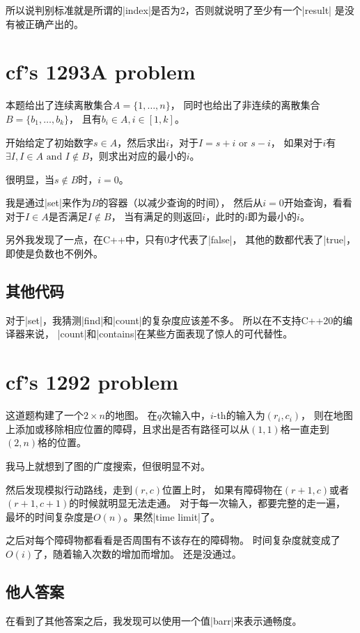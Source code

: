所以说判别标准就是所谓的\vb|index|是否为2，否则就说明了至少有一个\vb|result|
是没有被正确产出的。


\section{cf's 1293A problem}

本题给出了连续离散集合$A=\{1, \ldots, n\}$，
同时也给出了非连续的离散集合$B=\{b_1, \ldots, b_k\}$，
且有$b_i\in A, i\in [1, k]$。

开始给定了初始数字$s\in A$，然后求出$i$，对于$I=s+i\text{ or }s-i$，
如果对于$i$有$\exists I, I\in A\text{ and } I\notin B$，则求出对应的最小的$i$。

很明显，当$s\notin B$时，$i=0$。

我是通过\vb|set|来作为$B$的容器（以减少查询的时间），
然后从$i = 0$开始查询，看看对于$I\in A$是否满足$I\notin B$，
当有满足的则返回$i$，此时的$i$即为最小的$i$。

另外我发现了一点，在C++中，只有0才代表了\vb|false|，
其他的数都代表了\vb|true|，即使是负数也不例外。

\subsection{其他代码}
对于\vb|set|，我猜测\vb|find|和\vb|count|的复杂度应该差不多。
所以在不支持C++20的编译器来说，
\vb|count|和\vb|contains|在某些方面表现了惊人的可代替性。


\section{cf's 1292 problem}

这道题构建了一个$2\times n$的地图。
在$q$次输入中，$i$-th的输入为$(r_i, c_i)$，
则在地图上添加或移除相应位置的障碍，且求出是否有路径可以从$(1, 1)$格一直走到
$(2, n)$格的位置。

我马上就想到了图的广度搜索，但很明显不对。

然后发现模拟行动路线，走到$(r, c)$位置上时，
如果有障碍物在$(r+1, c)$或者$(r+1, c+1)$的时候就明显无法走通。
对于每一次输入，都要完整的走一遍，
最坏的时间复杂度是$O(n)$。果然\vb|time limit|了。

之后对每个障碍物都看看是否周围有不该存在的障碍物。
时间复杂度就变成了$O(i)$了，随着输入次数的增加而增加。
还是没通过。

\subsection{他人答案}
在看到了其他答案之后，我发现可以使用一个值\vb|barr|来表示通畅度。

